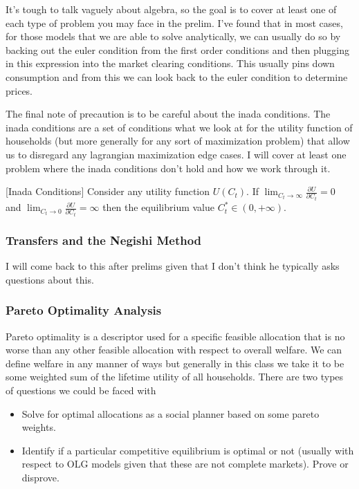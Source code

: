 \documentclass[11pt,english]{article}
\begin{document}
It's tough to talk vaguely about algebra, so the goal is to cover at least one of each type of problem you may face in the prelim. I've found that in most cases, for those models that we are able to solve analytically, we can usually do so by backing out the euler condition from the first order conditions and then plugging in this expression into the market clearing conditions. This usually pins down consumption and from this we can look back to the euler condition to determine prices.

The final note of precaution is to be careful about the inada conditions. The inada conditions are a set of conditions what we look at for the utility function of households (but more generally for any sort of maximization problem) that allow us to disregard any lagrangian maximization edge cases. I will cover at least one problem where the inada conditions don't hold and how we work through it.
\begin{definition}{[Inada Conditions]} Consider any utility function $U(C_t)$. If $\lim_{C_t \to \infty} \frac{\partial U}{\partial C_t} = 0$ and $\lim_{C_t \to 0} \frac{\partial U}{\partial C_t} = \infty$ then the equilibrium value $C_t^* \in (0,+\infty)$.
\end{definition}

\subsubsection{Transfers and the Negishi Method}

I will come back to this after prelims given that I don't think he typically asks questions about this.

\subsubsection{Pareto Optimality Analysis}

Pareto optimality is a descriptor used for a specific feasible allocation that is no worse than any other feasible allocation with respect to overall welfare. We can define welfare in any manner of ways but generally in this class we take it to be some weighted sum of the lifetime utility of all households. There are two types of questions we could be faced with
\begin{itemize}
\item Solve for optimal allocations as a social planner based on some pareto weights.
\item Identify if a particular competitive equilibrium is optimal or not (usually with respect to OLG models given that these are not complete markets). Prove or disprove.
\end{itemize}
\end{document}
